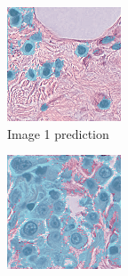 \begin{figure}[H]
  \centering
  \begin{subfigure}[b]{0.32\textwidth}
    \centering
    \includegraphics[width=\linewidth]{assets/images/for_presentation/exp1-1-pred.png}
    \caption{Image 1 prediction}
  \end{subfigure}\hfill
  \begin{subfigure}[b]{0.32\textwidth}
    \centering
    \includegraphics[width=\linewidth]{assets/images/for_presentation/exp1-2-pred.png}

\end{subfigure}
\end{figure}
